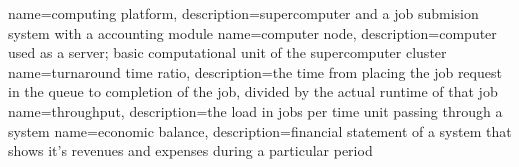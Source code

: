 
{
	name={computing platform},
	description={supercomputer and a job submision system with a accounting module}
}
{
	name=computer node,
	description={computer used as a server; basic computational unit of the supercomputer cluster}
}
{
	name=turnaround time ratio,
	description={the time from placing the job request in the queue to completion of the job, divided by the actual runtime of that job}
}
{
	name=throughput,
	description={the load in jobs per time unit passing through a system}
}
{
	name=economic balance,
	description={financial statement of a system that shows it’s revenues and expenses during a particular period}
}
